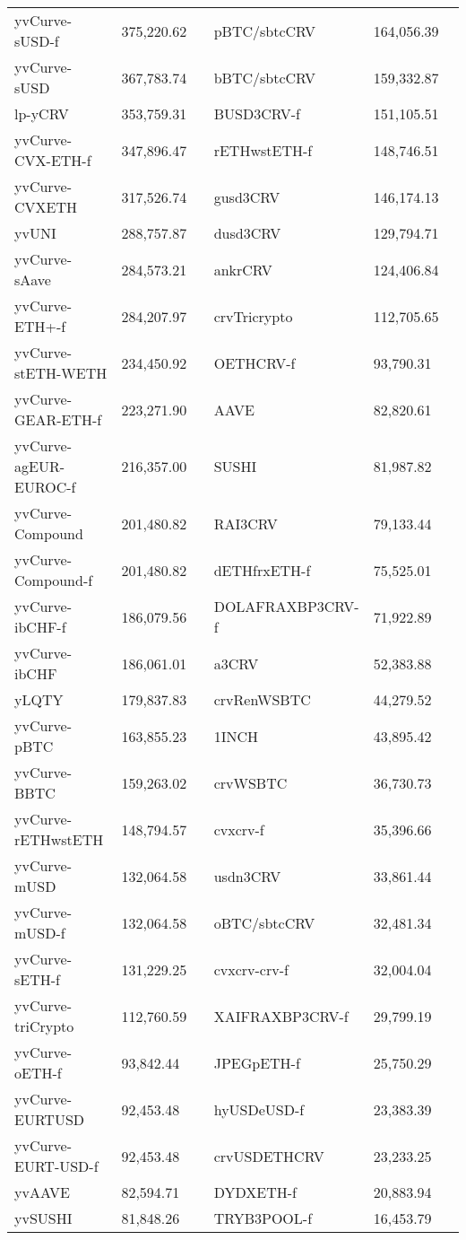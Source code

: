 \begin{longtable}{@{}p{0.25\linewidth}p{0.25\linewidth}p{0.25\linewidth}p{0.25\linewidth}@{}}
yvCurve-sUSD-f & 375,220.62 & pBTC/sbtcCRV &164,056.39 \\
yvCurve-sUSD & 367,783.74 & bBTC/sbtcCRV &159,332.87 \\
lp-yCRV & 353,759.31 & BUSD3CRV-f &151,105.51 \\
yvCurve-CVX-ETH-f & 347,896.47 & rETHwstETH-f &148,746.51 \\
yvCurve-CVXETH & 317,526.74 & gusd3CRV &146,174.13 \\
yvUNI & 288,757.87 & dusd3CRV &129,794.71 \\
yvCurve-sAave & 284,573.21 & ankrCRV &124,406.84 \\
yvCurve-ETH+-f & 284,207.97 & crvTricrypto &112,705.65 \\
yvCurve-stETH-WETH & 234,450.92 & OETHCRV-f &93,790.31 \\
yvCurve-GEAR-ETH-f & 223,271.90 & AAVE &82,820.61 \\
yvCurve-agEUR-EUROC-f & 216,357.00 & SUSHI &81,987.82 \\
yvCurve-Compound & 201,480.82 & RAI3CRV &79,133.44 \\
yvCurve-Compound-f & 201,480.82 & dETHfrxETH-f &75,525.01 \\
yvCurve-ibCHF-f & 186,079.56 & DOLAFRAXBP3CRV-f &71,922.89 \\
yvCurve-ibCHF & 186,061.01 & a3CRV &52,383.88 \\
yLQTY & 179,837.83 & crvRenWSBTC &44,279.52 \\
yvCurve-pBTC & 163,855.23 & 1INCH &43,895.42 \\
yvCurve-BBTC & 159,263.02 & crvWSBTC &36,730.73 \\
yvCurve-rETHwstETH & 148,794.57 & cvxcrv-f &35,396.66 \\
yvCurve-mUSD & 132,064.58 & usdn3CRV &33,861.44 \\
yvCurve-mUSD-f & 132,064.58 & oBTC/sbtcCRV &32,481.34 \\
yvCurve-sETH-f & 131,229.25 & cvxcrv-crv-f &32,004.04 \\
yvCurve-triCrypto & 112,760.59 & XAIFRAXBP3CRV-f &29,799.19 \\
yvCurve-oETH-f & 93,842.44 & JPEGpETH-f &25,750.29 \\
yvCurve-EURTUSD & 92,453.48 & hyUSDeUSD-f &23,383.39 \\
yvCurve-EURT-USD-f & 92,453.48 & crvUSDETHCRV &23,233.25 \\
yvAAVE & 82,594.71 & DYDXETH-f &20,883.94 \\
yvSUSHI & 81,848.26 & TRYB3POOL-f &16,453.79 \\

\end{longtable}
